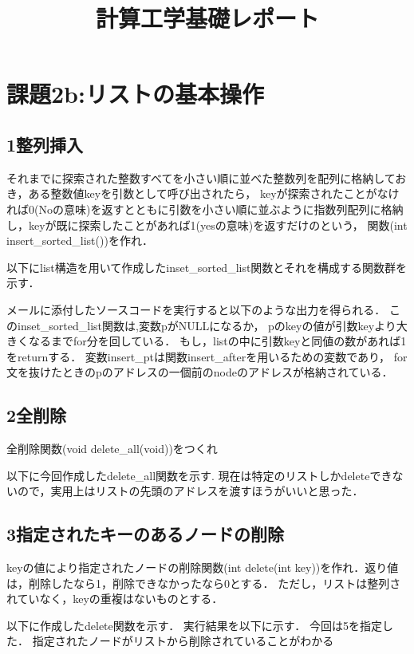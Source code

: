 \documentclass[titlepage]{jarticle}
\title{計算工学基礎レポート}
\author{}
\begin{document}
\section*{課題2b:リストの基本操作}
\subsection*{1整列挿入}

それまでに探索された整数すべてを小さい順に並べた整数列を配列に格納しておき，ある整数値keyを引数として呼び出されたら，
keyが探索されたことがなければ0(Noの意味)を返すとともに引数を小さい順に並ぶように指数列配列に格納し，keyが既に探索したことがあれば1(yesの意味)を返すだけのという，
関数(int insert\_sorted\_list())を作れ． 

以下にlist構造を用いて作成したinset\_sorted\_list関数とそれを構成する関数群を示す．

メールに添付したソースコードを実行すると以下のような出力を得られる．
このinset\_sorted\_list関数は,変数pがNULLになるか，
pのkeyの値が引数keyより大きくなるまでfor分を回している．
もし，listの中に引数keyと同値の数があれば1をreturnする．
変数insert\_ptは関数insert\_afterを用いるための変数であり，
for文を抜けたときのpのアドレスの一個前のnodeのアドレスが格納されている．
\subsection*{2全削除}
全削除関数(void delete\_all(void))をつくれ

以下に今回作成したdelete\_all関数を示す.
現在は特定のリストしかdeleteできないので，実用上はリストの先頭のアドレスを渡すほうがいいと思った．
\subsection*{3指定されたキーのあるノードの削除}
keyの値により指定されたノードの削除関数(int delete(int key))を作れ．返り値は，削除したなら1，削除できなかったなら0とする．
ただし，リストは整列されていなく，keyの重複はないものとする．

以下に作成したdelete関数を示す．
実行結果を以下に示す．
今回は5を指定した．
指定されたノードがリストから削除されていることがわかる
\end{document}
